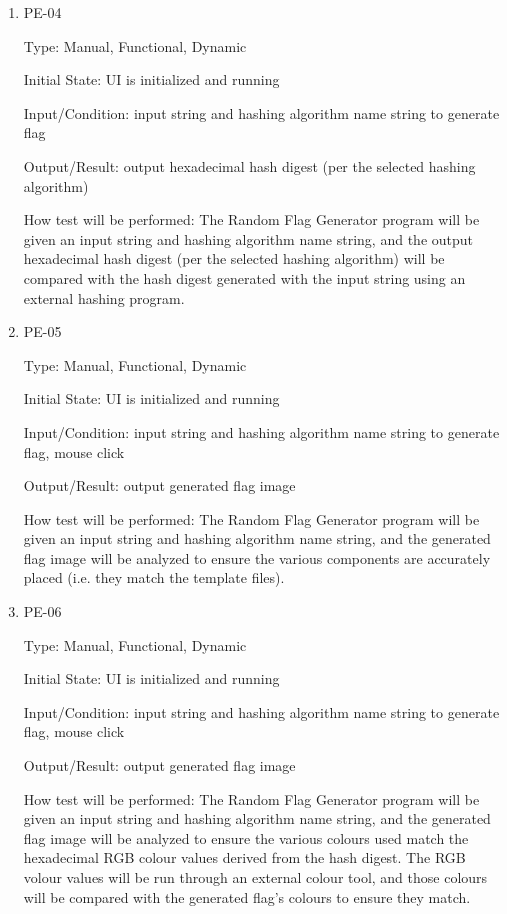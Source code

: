 \documentclass[12pt, titlepage]{article}
\begin{document}
\begin{enumerate}

\item{PE-04\\}

Type: Manual, Functional, Dynamic

Initial State: UI is initialized and running

Input/Condition: input string and hashing algorithm name string to generate
flag

Output/Result: output hexadecimal hash digest (per the selected hashing
algorithm)

How test will be performed: The Random Flag Generator program will be given an
input string and hashing algorithm name string, and the output hexadecimal
hash digest (per the selected hashing algorithm) will be compared with the
hash digest generated with the input string using an external hashing program.

\item{PE-05\\}

Type: Manual, Functional, Dynamic

Initial State: UI is initialized and running

Input/Condition: input string and hashing algorithm name string to generate
flag, mouse click

Output/Result: output generated flag image

How test will be performed: The Random Flag Generator program will be given an
input string and hashing algorithm name string, and the generated flag image
will be analyzed to ensure the various components are accurately placed (i.e.
they match the template files).

\item{PE-06\\}

Type: Manual, Functional, Dynamic

Initial State: UI is initialized and running

Input/Condition: input string and hashing algorithm name string to generate
flag, mouse click

Output/Result: output generated flag image

How test will be performed: The Random Flag Generator program will be given an
input string and hashing algorithm name string, and the generated flag image
will be analyzed to ensure the various colours used match the hexadecimal RGB
colour values derived from the hash digest. The RGB volour values will be run
through an external colour tool, and those colours will be compared with the
generated flag's colours to ensure they match.

\end{enumerate}
\end{document}
